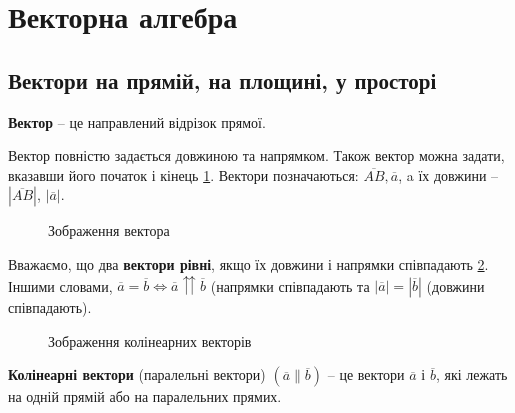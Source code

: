 \section{Векторна алгебра}

\subsection{Вектори на прямій, на площині, у просторі}

\begin{definition}[Вектор]
	\textbf{Вектор} -- це направлений відрізок прямої.
\end{definition}

Вектор повністю задається довжиною та напрямком. Також вектор можна
задати, вказавши його початок і кінець \ref{fig:alg:vector-image}.
Вектори позначаються: $\overline{AB}, \overline{a}$, a їх довжини -- $|\overline{AB}|$, $|\overline{a}|$.

\begin{figure}[ht]
    \centering
    \caption{Зображення вектора}
    \label{fig:alg:vector-image}
\end{figure}

Вважаємо, що два \textbf{вектори рівні}, якщо їх довжини і напрямки співпадають \ref{fig:alg:colinear-vectors-image}.
Іншими словами, $\overline{a} = \overline{b} \Leftrightarrow \overline{a} \upuparrows \overline{b}$ (напрямки співпадають
та $|\overline{a}| = |\overline{b}|$ (довжини співпадають).

\begin{figure}[ht]
    \centering
    \caption{Зображення колінеарних векторів}
    \label{fig:alg:colinear-vectors-image}
\end{figure}



\begin{definition}
    \textbf{Колінеарні вектори} (паралельні вектори) $(\overline{a} \parallel \overline{b})$
    -- це вектори $\overline{a}$ і $\overline{b}$, які лежать на одній прямій або на паралельних прямих.
\end{definition}

